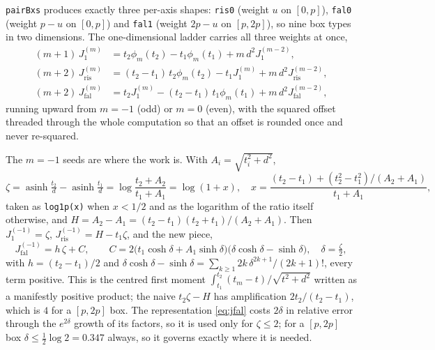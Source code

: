 \documentclass[11pt]{article}
\theoremstyle{remark}
\newcommand{\asinh}{\operatorname{asinh}}
\newcommand{\code}[1]{\texttt{#1}}
\begin{document}
\code{pairBxs} produces exactly three per-axis shapes: \code{ris0} (weight $u$ on
$[0,p]$), \code{fal0} (weight $p-u$ on $[0,p]$) and \code{fal1} (weight $2p-u$ on
$[p,2p]$), so nine box types in two dimensions. The one-dimensional ladder carries all
three weights at once,
\begin{equation}
\begin{aligned}
(m+1)\,J_1^{(m)} &= t_2\phi_m(t_2) - t_1\phi_m(t_1) + m\,d^2 J_1^{(m-2)},\\
(m+2)\,J_{\mathrm{ris}}^{(m)} &= (t_2-t_1)\,t_2\phi_m(t_2) - t_1 J_1^{(m)} + m\,d^2 J_{\mathrm{ris}}^{(m-2)},\\
(m+2)\,J_{\mathrm{fal}}^{(m)} &= t_2 J_1^{(m)} - (t_2-t_1)\,t_1\phi_m(t_1) + m\,d^2 J_{\mathrm{fal}}^{(m-2)},
\end{aligned}
\end{equation}
running upward from $m = -1$ (odd) or $m = 0$ (even), with the squared offset threaded
through the whole computation so that an offset is rounded once and never re-squared.

The $m = -1$ seeds are where the work is. With $A_i = \sqrt{t_i^2+d^2}$,
\begin{equation}
\zeta = \asinh\tfrac{t_2}{d} - \asinh\tfrac{t_1}{d} = \log\frac{t_2+A_2}{t_1+A_1}
 = \log(1+x),\quad x = \frac{(t_2-t_1) + (t_2^2-t_1^2)/(A_2+A_1)}{t_1+A_1},
\end{equation}
taken as \code{log1p(x)} when $x < 1/2$ and as the logarithm of the ratio itself
otherwise, and $H = A_2 - A_1 = (t_2-t_1)(t_2+t_1)/(A_2+A_1)$. Then
$J_1^{(-1)} = \zeta$, $J_{\mathrm{ris}}^{(-1)} = H - t_1\zeta$, and the new piece,
\begin{equation}
\boxed{\;
J_{\mathrm{fal}}^{(-1)} = h\,\zeta + C,
\qquad
C = 2\bigl(t_1\cosh\delta + A_1\sinh\delta\bigr)\bigl(\delta\cosh\delta - \sinh\delta\bigr),
\quad \delta = \tfrac{\zeta}{2},\;}
\label{eq:jfal}
\end{equation}
with $h = (t_2-t_1)/2$ and
$\delta\cosh\delta - \sinh\delta = \sum_{k\ge1} 2k\,\delta^{2k+1}/(2k+1)!$, every term
positive. This is the centred first moment $\int_{t_1}^{t_2}(t_m - t)/\sqrt{t^2+d^2}$
written as a manifestly positive product; the naive $t_2\zeta - H$ has amplification
$2t_2/(t_2-t_1)$, which is $4$ for a $[p,2p]$ box. The representation \eqref{eq:jfal}
costs $2\delta$ in relative error through the $e^{2\delta}$ growth of its factors, so it is
used only for $\zeta \le 2$; for a $[p,2p]$ box $\delta \le \tfrac12\log 2 = 0.347$
always, so it governs exactly where it is needed.
\end{document}
